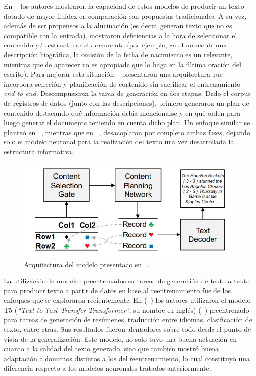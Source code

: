  En ~\cite{wiseman-etal-2017-challenges} los autores mostraron la capacidad de estos modelos de producir un texto dotado de mayor 
fluidez en comparación con propuestas tradicionales. A su vez, además de ser propensos a la alucinación (es decir, generan texto que no es compatible con la entrada), 
mostraron  deficiencias a la hora de seleccionar el contenido y/o estructurar el documento (por ejemplo, en el marco de una descripción biográfica, la omisión de la fecha de nacimiento es un relevante, 
mientras que de aparecer no es apropiado que lo haga en la última oración del escrito). Para mejorar esta situación ~\cite{puduppully2019dataselandplan}  
presentaron una arquitectura que incorpora selección y planificación de contenido sin sacrificar el entrenamiento \emph{end-to-end}. Descompusieron la tarea de generación en dos etapas. Dado el corpus de 
registros de datos (junto con las descripciones), primero generaron un plan de contenido destacando qué información debía mencionarse y en qué orden para luego generar el documento teniendo en 
cuenta dicho plan. Un enfoque similar se planteó en ~\cite{chen2021neural}, mientras que en ~\cite{moryossef2019step}, desacoplaron por completo ambas fases, dejando solo el modelo neuronal para la realización del 
texto una vez desarrollada la estructura informativa.

        \begin{figure}[!]
            \begin{center}
                \includegraphics[scale=0.4]{Graphics/lapata_arquitectura.png}
            \end{center}
            \caption{Arquitectura del modelo presentado en ~\cite{puduppully2019dataselandplan}.}
            \label{fig_lapata_arquitectura}
        \end{figure}


    La utilización de modelos preentrenados en tareas de generación de texto-a-texto para producir texto a partir de datos en base al reentrenamiento 
fue de los enfoques que se exploraron recientemente. En (~\cite{kale2020text}) los autores utilizaron el modelo T5 (\emph{“Text-to-Text Transfer Transformer”}, su nombre en inglés) (~\cite{raffel2020exploring})
preentrenado para tareas de generación de resúmenes, traducción entre idiomas, clasificación de texto, entre otras. Sus resultados fueron alentadores sobre todo desde el punto de vista de 
la generalización. Este modelo, no solo tuvo una buena actuación en cuanto a la calidad del texto generado, sino que también mostró buena adaptación a dominios distintos a los 
del reentrenamiento, lo cual constituyó una diferencia respecto a los modelos neuronales tratados anteriormente.


